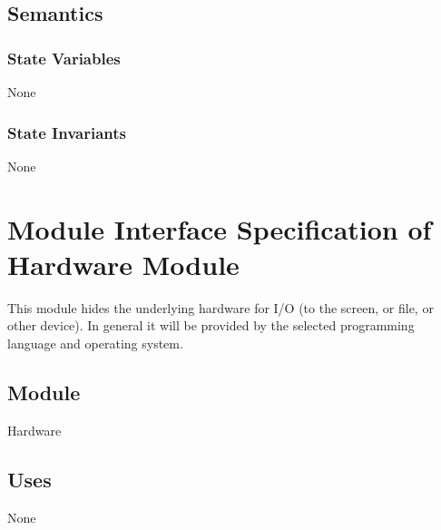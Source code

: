 \documentclass[12pt]{article}
\begin{document}
\subsection{Semantics}
\label{Sec:Semantics}
\subsubsection{State Variables}
\label{Sec:StateVars}
None
\subsubsection{State Invariants}
\label{Sec:StateInvars}
None
\section{Module Interface Specification of Hardware Module}
\label{Sec:Hardware}
This module hides the underlying hardware for I/O (to the screen, or file, or other device). In general it will be provided by the selected programming language and operating system.
\subsection{Module}
\label{Sec:Module}
Hardware
\subsection{Uses}
\label{Sec:Uses}
None
\end{document}
